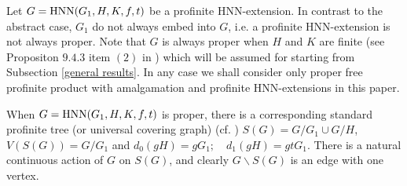 \documentclass[a4paper,12pt]{article}
\newcommand{\G}{{\cal G}}
\def\hnn {{\rm HNN}}
\begin{document}
{%


\medskip 


Let $G=\hnn(G_1, H, K, f, t)$ be a profinite HNN-extension. In contrast to the abstract case, $G_1$ do not always embed into $G$, i.e. a  profinite HNN-extension is not always proper. Note that $G$ is always proper  when $H$ and $K$ are finite (see Propositon $9.4.3$ item $(2)$ in \cite{RZ}) which will be assumed for starting from Subsection \ref{general results}.  In any case we shall consider only proper free profinite product with amalgamation and profinite HNN-extensions in this paper.

When $G=\hnn(G_1,H,K,f,t)$ is proper, there is
a corresponding    standard profinite tree  (or universal covering graph) 
  (cf. \cite[Theorem 3.8]{ZM1}) $S(G)=G/G_1\cup G/H$, $V(S(G))=G/G_1$ and  $d_0 (gH)= gG_1; \quad  d_1(gH)=gtG_1 $. There is a natural  continuous action of
 $G$ on $S(G)$, and clearly $ G\backslash S(G)$ is an edge with one vertex. 


}
\end{document}
